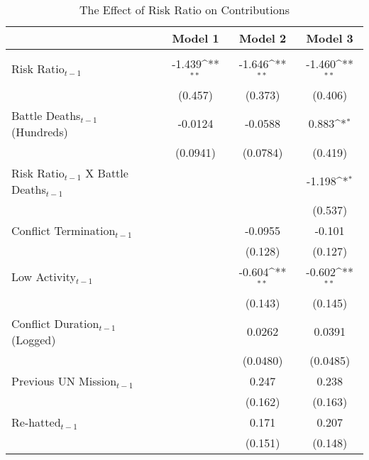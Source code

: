 \begin{table}[htbp]\centering
\footnotesize
\def\sym#1{\ifmmode^{#1}\else\(^{#1}\)\fi}
\caption{The Effect of Risk Ratio on Contributions \label{Table 2}}
\begin{tabular}{l*{3}{c}}
\hline\hline
                    &\multicolumn{1}{c}{Model 1}        &\multicolumn{1}{c}{Model 2}        &\multicolumn{1}{c}{Model 3}        \\
\hline \\
Risk Ratio$_{t-1}$          &      -1.439\sym{**}&      -1.646\sym{**}&      -1.460\sym{**}\\
                    &     (0.457)        &     (0.373)        &     (0.406)        \\
[0.25em]
Battle Deaths$_{t-1}$ (Hundreds)&     -0.0124        &     -0.0588        &       0.883\sym{*} \\
                    &    (0.0941)        &    (0.0784)        &     (0.419)        \\
[0.25em]
Risk Ratio$_{t-1}$ X Battle Deaths$_{t-1}$&                    &                    &      -1.198\sym{*} \\
                    &                    &                    &     (0.537)        \\
[0.25em]
Conflict Termination$_{t-1}$&                    &     -0.0955        &      -0.101        \\
                    &                    &     (0.128)        &     (0.127)        \\
[0.25em]
Low Activity$_{t-1}$        &                    &      -0.604\sym{**}&      -0.602\sym{**}\\
                    &                    &     (0.143)        &     (0.145)        \\
[0.25em]
Conflict Duration$_{t-1}$ (Logged)&                    &      0.0262        &      0.0391        \\
                    &                    &    (0.0480)        &    (0.0485)        \\
[0.25em]
Previous UN Mission$_{t-1}$       &                    &       0.247        &       0.238        \\
                    &                    &     (0.162)        &     (0.163)        \\
[0.25em]
Re-hatted$_{t-1}$          &                    &       0.171        &       0.207        \\
                    &                    &     (0.151)        &     (0.148)        \\

\end{tabular}
\end{table}
